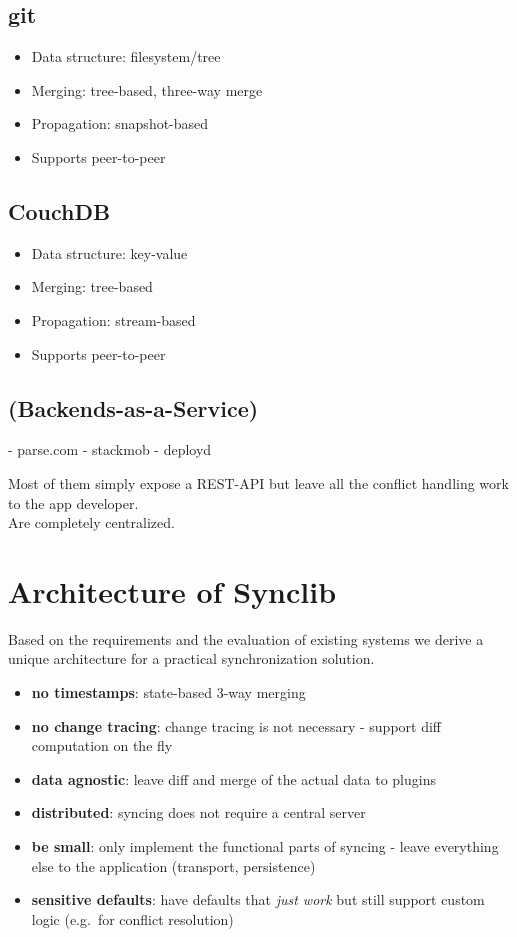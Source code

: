 \subsection{git}

\begin{itemize}
\item
  Data structure: filesystem/tree
\item
  Merging: tree-based, three-way merge
\item
  Propagation: snapshot-based
\item
  Supports peer-to-peer
\end{itemize}

\subsection{CouchDB}

\begin{itemize}
\item
  Data structure: key-value
\item
  Merging: tree-based
\item
  Propagation: stream-based
\item
  Supports peer-to-peer
\end{itemize}

\subsection{(Backends-as-a-Service)}
- parse.com
- stackmob
- deployd

Most of them simply expose a REST-API but leave all the conflict handling work to the app developer.\\
Are completely centralized.

\section{Architecture of Synclib}
Based on the requirements and the evaluation of existing systems we derive a unique architecture for a practical synchronization solution.

\begin{itemize}
\item
  \textbf{no timestamps}: state-based 3-way merging
\item
  \textbf{no change tracing}: change tracing is not necessary - support
  diff computation on the fly
\item
  \textbf{data agnostic}: leave diff and merge of the actual data to
  plugins
\item
  \textbf{distributed}: syncing does not require a central server
\item
  \textbf{be small}: only implement the functional parts of syncing -
  leave everything else to the application (transport, persistence)
\item
  \textbf{sensitive defaults}: have defaults that \emph{just work} but
  still support custom logic (e.g.~for conflict resolution)
\end{itemize}

